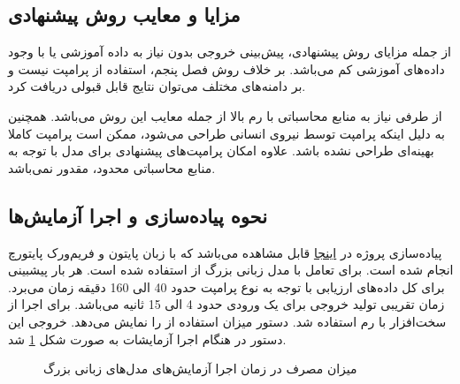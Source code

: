 \subsection{مزایا و معایب روش پیشنهادی}
از جمله مزایای روش پیشنهادی، پیش‌بینی خروجی بدون نیاز به داده‌ آموزشی یا با وجود داده‌های آموزشی کم می‌باشد. بر خلاف روش فصل پنجم، استفاده از پرامپت 
نیست و بر دامنه‌های مختلف می‌توان نتایج قابل قبولی دریافت کرد.

از طرفی نیاز به منابع محاسباتی 
با رم بالا از جمله معایب این روش می‌باشد. همچنین به دلیل اینکه پرامپت توسط نیروی انسانی طراحی می‌شود، ممکن است پرامپت کاملا بهینه‌ای طراحی نشده باشد. علاوه امکان 
پرامپت‌های پیشنهادی برای مدل با توجه به منابع محاسباتی محدود، مقدور نمی‌باشد.
\subsection{نحوه پیاده‌سازی و اجرا آزمایش‌ها}
پیاده‌سازی پروژه در 
\href{https://github.com/ghazaleh-mahmoodi/Climate_Activism_Stance_Detection}{اینجا}
قابل مشاهده می‌باشد که با زبان پایتون و فریم‌ورک پایتورچ انجام شده است. برای تعامل با مدل زبانی بزرگ از 
استفاده شده است. هر بار پیشبینی برای کل داده‌های ارزیابی با توجه به نوع پرامپت حدود 40 الی 160 دقیقه زمان می‌برد. زمان تقریبی تولید خروجی برای یک ورودی حدود 4 الی 15 ثانیه می‌باشد.
\newline
برای اجرا از سخت‌افزار
با رم 
استفاده شد. دستور 
میزان استفاده از 
را نمایش می‌دهد. خروجی این دستور در هنگام اجرا آزمایشات به صورت شکل 
\ref{nvidia-smi-prompt} شد.
\begin{figure}[H]		  		    			  	 
	\caption{میزان مصرف در زمان اجرا آزمایش‌های مدل‌های زبانی بزرگ}
	\label{nvidia-smi-prompt}
\end{figure}



